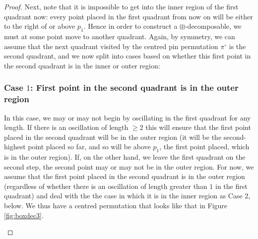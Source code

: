 \documentclass[11pt,a4paper]{article}
\theoremstyle{definition}
\begin{document}
\begin{proof}
Next, note that it is impossible to get into the inner region of the first quadrant now: every point placed in the first quadrant from now on will be either to the right of or above $p_{1}$. Hence in order to construct a $\boxplus$-decomposable, we must at some point move to another quadrant. Again, by symmetry, we can assume that the next quadrant visited by the centred pin permutation $\pi^{\circ}$ is the second quadrant, and we now split into cases based on whether this first point in the second quadrant is in the inner or outer region:

\subsubsection*{Case $1$: First point in the second quadrant is in the outer region}

In this case, we may or may not begin by oscillating in the first quadrant for any length. If there is an oscillation of length $\geq 2$ this will ensure that the first point placed in the second quadrant will be in the outer region (it will be the second-highest point placed so far, and so will be above $p_{1}$, the first point placed, which is in the outer region). If, on the other hand, we leave the first quadrant on the second step, the second point may or may not be in the outer region. For now, we assume that the first point placed in the second quadrant is in the outer region (regardless of whether there is an oscillation of length greater than $1$ in the first quadrant) and deal with the the case in which it is in the inner region as Case $2$, below. We thus have a centred permutation that looks like that in Figure \ref{fig:boxdec3}.

\begin{figure}[h]
\begin{center}
\end{center}
\end{figure}
\end{proof}
\end{document}

